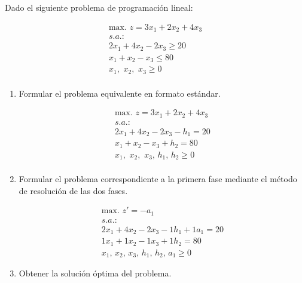 Dado el siguiente problema de programación lineal:

\begin{equation}
\begin{split}
\mbox{max. } z = 3x_1 + 2x_2 + 4x_3\\
s.a.:\\
2x_1 + 4x_2 - 2x_3 \geq 20\\
 x_1 +  x_2 -  x_3 \leq 80\\
x_1,\,\,x_2,\,\,x_3\geq 0\\
\end{split}
\end{equation}


\begin{enumerate}
    \item Formular el problema equivalente en formato estándar.

    \begin{equation}
    \begin{split}
    \mbox{max. } z = 3x_1 + 2x_2 + 4x_3\\
    s.a.:\\
    2x_1 + 4x_2 - 2x_3 - h_1 = 20\\
     x_1 +  x_2 -  x_3 + h_2 = 80\\
    x_1,\,\,x_2,\,\,x_3,\,h_1,\,h_2\geq 0\\
    \end{split}
    \end{equation}


    \item Formular el problema correspondiente a la primera fase mediante el método de resolución de las dos fases.

\begin{equation}
\begin{split}
\mbox{max. } z' = -a_1\\
s.a.:\\
2x_1+4x_2-2x_3-1h_1+1a_1 = 20\\
1x_1+1x_2-1x_3+1h_2 = 80\\
x_1,\,x_2,\,x_3,\,h_1,\,h_2,\,a_1\geq 0\end{split}
\end{equation}

\item Obtener la solución óptima del problema.



\end{enumerate}
